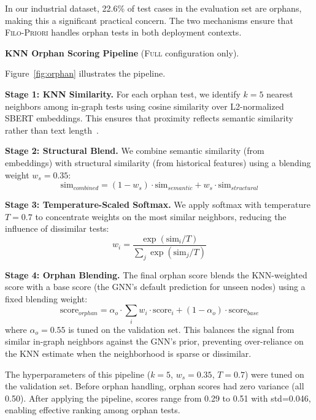 \documentclass[10pt,journal,compsoc]{IEEEtran}
\newcommand{\filopriori}{\textsc{Filo-Priori}}
\begin{document}
In our industrial dataset, 22.6\% of test cases in the evaluation set are
orphans, making this a significant practical concern. The two mechanisms
ensure that \filopriori{} handles orphan tests in both deployment contexts.

\textbf{KNN Orphan Scoring Pipeline} (\textsc{Full} configuration only).
\label{sec:orphan}

Figure~\ref{fig:orphan} illustrates the pipeline.

\textbf{Stage 1: KNN Similarity.} For each orphan test, we identify
$k=5$ nearest neighbors among in-graph tests using cosine similarity over
L2-normalized SBERT embeddings. This ensures that proximity reflects
semantic similarity rather than text length~\cite{reimers2019sentence}.

\textbf{Stage 2: Structural Blend.} We combine semantic similarity (from
embeddings) with structural similarity (from historical features) using a
blending weight $w_s = 0.35$:
\begin{equation}
    \text{sim}_{combined} = (1 - w_s) \cdot \text{sim}_{semantic} + w_s \cdot \text{sim}_{structural}
\end{equation}

\textbf{Stage 3: Temperature-Scaled Softmax.} We apply softmax with temperature
$T=0.7$ to concentrate weights on the most similar neighbors, reducing the
influence of dissimilar tests:
\begin{equation}
    w_i = \frac{\exp(\text{sim}_i / T)}{\sum_j \exp(\text{sim}_j / T)}
\end{equation}

\textbf{Stage 4: Orphan Blending.} The final orphan score blends the
KNN-weighted score with a base score (the GNN's default prediction for
unseen nodes) using a fixed blending weight:
\begin{equation}
    \text{score}_{orphan} = \alpha_o \cdot \sum_i w_i \cdot \text{score}_i + (1-\alpha_o) \cdot \text{score}_{base}
\end{equation}
where $\alpha_o = 0.55$ is tuned on the validation set. This balances the
signal from similar in-graph neighbors against the GNN's prior, preventing
over-reliance on the KNN estimate when the neighborhood is sparse or
dissimilar.

The hyperparameters of this pipeline ($k=5$, $w_s=0.35$, $T=0.7$) were tuned on the validation set.
Before orphan handling, orphan scores had zero variance (all 0.50). After
applying the pipeline, scores range from 0.29 to 0.51 with std=0.046,
enabling effective ranking among orphan tests.
\end{document}
